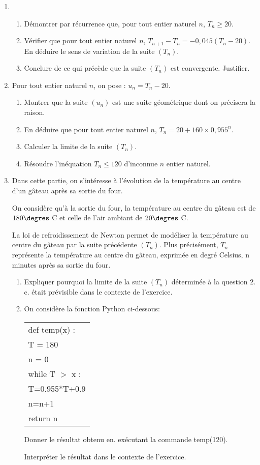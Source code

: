 \documentclass[10pt]{article}
\begin{document}
\begin{enumerate}
\item 
	\begin{enumerate}
		\item Démontrer par récurrence que, pour tout entier naturel $n$,\: $T_n \geqslant 20$.
		\item Vérifier que pour tout entier naturel $n$,\: $T_{n+1} -  T_n  = - 0,045\left(T_n - 20\right)$. En déduire le sens de variation de la suite $\left(T_n\right)$.
		\item Conclure de ce qui précède que la suite $\left(T_n\right)$ est convergente. Justifier.
	\end{enumerate}	
\item Pour tout entier naturel $n$, on pose : $u_n =  T_n - 20$.
	\begin{enumerate}
		\item Montrer que la suite $\left(u_n\right)$ est une suite géométrique dont on précisera la raison.
		\item En déduire que pour tout entier naturel $n$, \:$T_n =  20 + 160 \times  0,955^n$.
		\item Calculer la limite de la suite $\left(T_n\right)$.
		\item Résoudre l'inéquation $T_n \leqslant 120$ d'inconnue $n$ entier naturel.
	\end{enumerate}	
\item Dans cette partie, on s'intéresse à l'évolution de la température au centre d'un gâteau après sa sortie du four. 

On considère qu'à la sortie du four, la température au centre du gâteau est de $180 \degres$ C et celle de l'air ambiant de $20 \degres$ C.

La loi de refroidissement de Newton permet de modéliser la température au centre du gâteau par la suite précédente $\left(T_n\right)$. Plus précisément, $T_n$ représente la température au centre du gâteau, exprimée en degré Celsius, n minutes après sa sortie du four.
	\begin{enumerate}
		\item Expliquer pourquoi la limite de la suite $\left(T_n\right)$ déterminée à la question 2. c. était prévisible dans le contexte de l'exercice.
		\item On considère la fonction Python ci-dessous:
		\begin{center}
		\begin{tabular}{|l|}\hline
def temp(x) :\\
\quad T = 180\\
\quad n = 0\\
\quad while T $>$ x :\\
\qquad T=0.955*T+0.9\\
\qquad n=n+1\\
\quad return n\\ \hline
\end{tabular}
\end{center}
Donner le résultat obtenu en. exécutant la commande temp(120).

Interpréter le résultat dans le contexte de l'exercice.
	\end{enumerate}
\end{enumerate}
\end{document}
